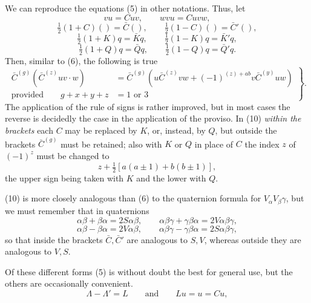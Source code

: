 \documentclass[11pt]{article}
\begin{document}
\indent We can reproduce the equations (5) in other notations. Thus, let
\[vu=Cuv,\qquad wvu=Cuvw,\]
\[\tfrac12(1+C)()=\bar C(),\qquad \tfrac12(1-C)()=\bar C'(),\]
\[\tfrac12(1+K)q=\bar Kq,\qquad \tfrac12(1-K)q=\bar K'q,\]
\[\tfrac12(1+Q)q=\bar Qq,\qquad \tfrac12(1-Q)q=\bar Q'q.\]
Then, similar to (6), the following is true
\begin{equation}\left.\begin{aligned}\bar C^{(g)}(\bar C^{(z)}uv\cdot w)&=\bar C^{(g)}(u\bar C^{(z)}vw+(-1)^{(z)+ab}v\bar C^{(y)}uw)\\\text{provided}\qquad g+x+y+z&=1\text{ or }3\end{aligned}\right\}.\tag{10}\end{equation}
The application of the rule of signs is rather improved, but in most cases the reverse is decidedly the case in the application of the proviso. In (10) \emph{within the brackets} each $C$ may be replaced by $K$, or, instead, by $Q$, but outside the brackets $\bar C^{(g)}$ must be retained; also with $K$ or $Q$ in place of $C$ the index $z$ of $(-1)^z$ must be changed to
\[z+\tfrac12[a(a\pm1)+b(b\pm1)],\]
the upper sign being taken with $K$ and the lower with $Q$.

(10) is more closely analogous than (6) to the quaternion formula for $V_\alpha V_\beta\gamma$, but we must remember that in quaternions
\[\alpha\beta+\beta\alpha=2S\alpha\beta,\qquad \alpha\beta\gamma+\gamma\beta\alpha=2V\alpha\beta\gamma,\]
\[\alpha\beta-\beta\alpha=2V\alpha\beta,\qquad \alpha\beta\gamma-\gamma\beta\alpha=2S\alpha\beta\gamma,\]
so that inside the brackets $\bar C,\bar C'$ are analogous to $S,V$, whereas outside they are analogous to $V,S$.

\indent Of these different forms (5) is without doubt the best for general use, but the others are occasionally convenient.
\[\Lambda-\Lambda'=L\qquad\text{and}\qquad Lu=u=Cu,\]
\end{document}
